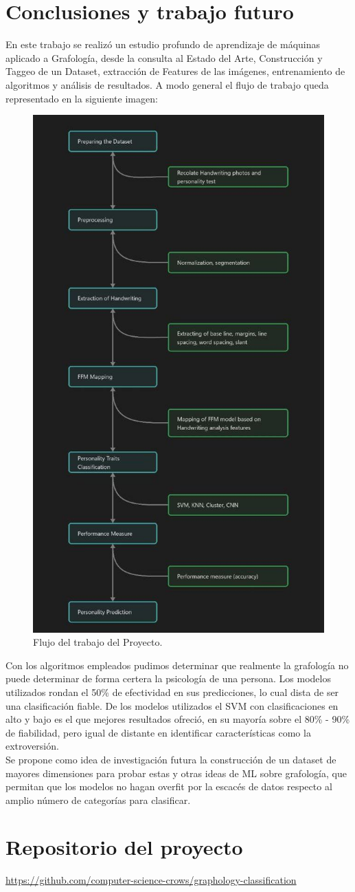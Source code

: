 \documentclass[10pt, a4paper]{article}
\begin{document}
    \section{Conclusiones y trabajo futuro}
        En este trabajo se realiz\'o un estudio profundo de aprendizaje de m\'aquinas aplicado a Grafolog\'ia, desde la consulta al Estado del Arte, Construcci\'on y Taggeo de un Dataset, extracci\'on de Features de las im\'agenes, entrenamiento de algoritmos y an\'alisis de resultados. A modo general el flujo de trabajo queda representado en la siguiente imagen: 

        \begin{figure}[H]
            \centering
            \includegraphics[width = 0.4\linewidth]{photo_2023-05-29_02-40-00.jpg}
            \caption{Flujo del trabajo del Proyecto.}
        \end{figure}


        Con los algoritmos empleados pudimos determinar que realmente la grafolog\'ia no puede determinar de 
        forma certera la psicolog\'ia de una persona. Los modelos utilizados rondan el 50\% de efectividad en sus predicciones, 
        lo cual dista de ser una clasificaci\'on fiable. De los modelos utilizados el SVM con clasificaciones en alto y bajo es el que mejores 
        resultados ofreci\'o, en su mayor\'ia sobre el 80\% - 90\% de fiabilidad, pero igual de distante en identificar caracter\'isticas como la extroversi\'on.\\ 

        Se propone como idea de investigaci\'on futura la construcci\'on de un dataset de mayores dimensiones para probar estas y otras ideas de ML sobre grafolog\'ia, que 
        permitan que los modelos no hagan overfit por la escac\'es de datos respecto al amplio n\'umero de categor\'ias para clasificar. 

        \section{Repositorio del proyecto}
		\begin{center}
			\small \url{https://github.com/computer-science-crows/graphology-classification}
		\end{center}

        
        
\end{document}
